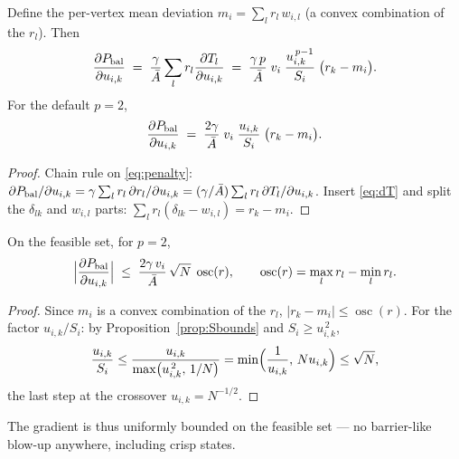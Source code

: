 \documentclass[11pt,a4paper]{article}
\begin{document}
\begin{prop}
\label{prop:grad}
Define the per-vertex mean deviation $m_i = \sum_l r_l\, w_{i,l}$ (a convex
combination of the $r_l$). Then
\begin{equation}
  \dfrac{\partial P_{\mathrm{bal}}}{\partial u_{i,k}}
  \;=\; \frac{\gamma}{\bar{A}}\sum_l r_l \dfrac{\partial T_l}{\partial u_{i,k}}
  \;=\; \frac{\gamma\, p}{\bar{A}}\; v_i\;
        \frac{u_{i,k}^{\,p-1}}{S_i}\;\bigl(r_k - m_i\bigr).
  \label{eq:grad}
\end{equation}
For the default $p=2$,
\begin{equation}
  \dfrac{\partial P_{\mathrm{bal}}}{\partial u_{i,k}}
  \;=\; \frac{2\gamma}{\bar{A}}\; v_i\; \frac{u_{i,k}}{S_i}\;
        \bigl(r_k - m_i\bigr).
  \label{eq:gradp2}
\end{equation}
\end{prop}

\begin{proof}
Chain rule on \eqref{eq:penalty}:
$\partial P_{\mathrm{bal}}/\partial u_{i,k}
 = \gamma\sum_l r_l\,\partial r_l/\partial u_{i,k}
 = (\gamma/\bar{A})\sum_l r_l\,\partial T_l/\partial u_{i,k}$.
Insert \eqref{eq:dT} and split the $\delta_{lk}$ and $w_{i,l}$ parts:
$\sum_l r_l(\delta_{lk}-w_{i,l}) = r_k - m_i$.
\end{proof}

\begin{prop}
\label{prop:gradbound}
On the feasible set, for $p=2$,
\begin{equation}
  \Bigl|\dfrac{\partial P_{\mathrm{bal}}}{\partial u_{i,k}}\Bigr|
  \;\le\; \frac{2\gamma\, v_i}{\bar{A}}\,\sqrt{N}\;
          \operatorname{osc}(r),
  \qquad
  \operatorname{osc}(r) = \max_l r_l - \min_l r_l .
  \label{eq:gradbound}
\end{equation}
\end{prop}

\begin{proof}
Since $m_i$ is a convex combination of the $r_l$,
$|r_k-m_i|\le\operatorname{osc}(r)$. For the factor $u_{i,k}/S_i$: by
Proposition~\ref{prop:Sbounds} and $S_i\ge u_{i,k}^{\,2}$,
\[
  \frac{u_{i,k}}{S_i}
  \le \frac{u_{i,k}}{\max\bigl(u_{i,k}^{\,2},\,1/N\bigr)}
  = \min\Bigl(\frac{1}{u_{i,k}},\, N u_{i,k}\Bigr)
  \le \sqrt N,
\]
the last step at the crossover $u_{i,k}=N^{-1/2}$.
\end{proof}

The gradient is thus uniformly bounded on the feasible set — no barrier-like
blow-up anywhere, including crisp states.
\end{document}
